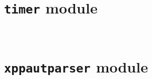 \documentclass[letterpaper,10pt,english]{sphinxmanual}
\begin{document}
\begin{fulllineitems}
\label{eqparse:eqparse.smc_helper_functions.error}
\end{fulllineitems}



\section{\texttt{timer} module}
\label{eqparse:timer-module}\label{eqparse:module-eqparse.timer}

\begin{fulllineitems}
\label{eqparse:eqparse.timer.Timer}~

\begin{fulllineitems}
\label{eqparse:eqparse.timer.Timer.finish}
\end{fulllineitems}


\begin{fulllineitems}
\label{eqparse:eqparse.timer.Timer.start}
\end{fulllineitems}


\end{fulllineitems}



\section{\texttt{xppautparser} module}
\label{eqparse:xppautparser-module}\label{eqparse:module-eqparse.xppautparser}
\end{document}
